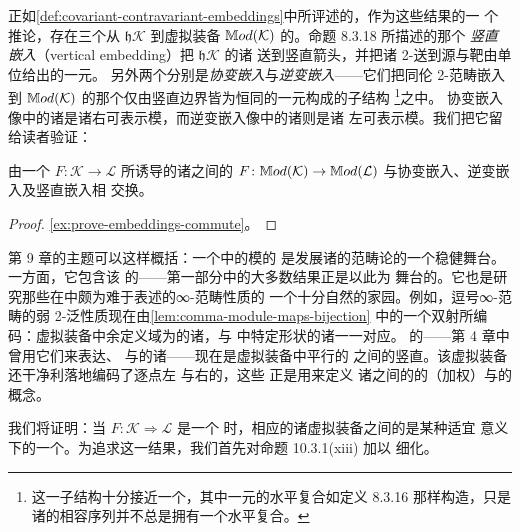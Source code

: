 正如\cref{def:covariant-contravariant-embeddings}中所评述的，作为这些结果的一
个推论，存在三个从\trHomotopyTwoCategory{} $\mathfrak{h}\mathcal{K}$ 到虚拟装备
$\mathbb{M}od(\mathcal{K})$ 的\trLocallyFullyFaithful\trHomomorphism。命题 8.3.18 所描述的那个%
\emph{竖直嵌入}（vertical embedding）把 $\mathfrak{h}\mathcal{K}$ 的诸\trFunctor{}%
送到竖直箭头，并把诸 2-\trCell{}送到源与靶由单位\trModule{}给出的一元\trCell。
另外两个分别是\emph{协变嵌入}与\emph{逆变嵌入}——它们把同伦 2-范畴嵌入到
$\mathbb{M}od(\mathcal{K})$ 的那个仅由竖直边界皆为恒同的一元\trCell{}构成的子结构%
\footnote{这一子结构十分接近一个\trBicategory，其中一元\trCell{}的水平复合如定义
8.3.16 那样构造，只是诸\trModule{}的相容序列并不总是拥有一个水平复合。}之中。
协变嵌入像中的诸\trModule{}是诸右可表示模，而逆变嵌入像中的诸\trModule{}则是诸
左可表示模。我们把它留给读者验证：

\begin{lemma}\label{lem:vdc-functor-commutes-with-embeddings}
由一个\trCosmologicalFunctor{}
$F\colon\mathcal{K}\to\mathcal{L}$ 所诱导的诸\trVirtualEquipment{}之间的%
\trFunctor{}
$F\colon\mathbb{M}od(\mathcal{K})\to\mathbb{M}od(\mathcal{L})$ 与协变嵌入、逆变嵌入及竖直嵌入相
交换。
\end{lemma}

\begin{proof}
\cref{ex:prove-embeddings-commute}。
\end{proof}

第 9 章的主题可以这样概括：一个\trInfinityCosmos{}中的模的\trVirtualEquipment{}%
是发展诸\trInfinityCategory{}的范畴论的一个稳健舞台。一方面，它包含该%
\trInfinityCosmos{}的\trHomotopyTwoCategory——第一部分中的大多数结果正是以此为
舞台的。它也是研究那些在\trHomotopyTwoCategory{}中颇为难于表述的∞-范畴性质的
一个十分自然的家园。例如，逗号∞-范畴的弱 2-泛性质现在由\cref{lem:comma-module-maps-bijection}
中的一个双射所编码：虚拟装备中余定义域为\trCommaModule{}的诸\trCell{}，与%
\trHomotopyTwoCategory{}中特定形状的诸\trNaturalTransformation{}一一对应。
\trModule{}的\trFiberedEquivalence——第 4 章中曾用它们来表达\trAdjunction、%
\trLimit{}与\trColimit{}的诸\trUniversalProperty——现在是虚拟装备中平行的%
\trModule{}之间的竖直\trIsomorphism。该虚拟装备还干净利落地编码了逐点左%
\trKanExtension{}与右\trKanExtension{}的\trUniversalProperty，这些%
\trKanExtension{}正是用来定义
诸\trInfinityCategory{}之间的\trFunctor{}的（加权）\trLimit{}与\trColimit{}的
概念。

我们将证明：当 $F\colon\mathcal{K}\Rightarrow\mathcal{L}$ 是一个%
\trCosmologicalBiequivalence{}时，相应的诸虚拟装备之间的\trFunctor{}是某种适宜
意义下的一个\trBiequivalence。为追求这一结果，我们首先对命题 10.3.1(xiii) 加以
细化。


